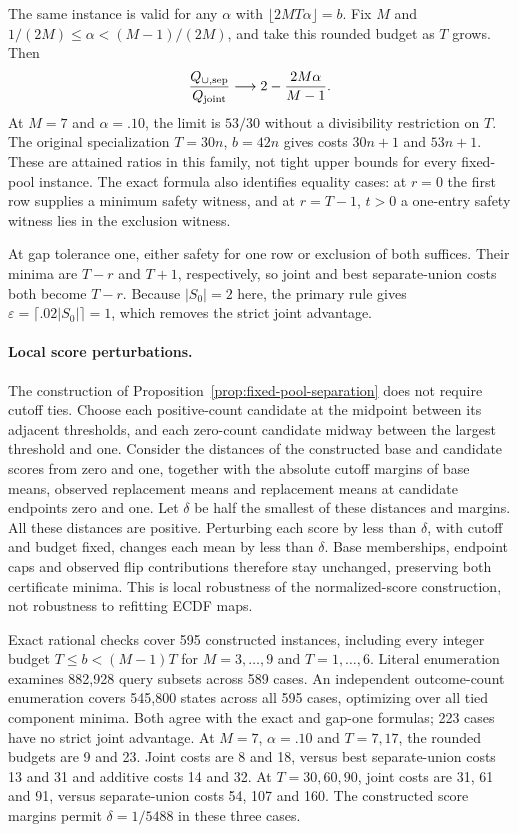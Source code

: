 The same instance is valid for any $\alpha$ with $\lfloor2MT\alpha\rfloor=b$. Fix $M$ and $1/(2M)\le\alpha<(M-1)/(2M)$, and take this rounded budget as $T$ grows. Then
\[
 \frac{Q_{\cup,\rm sep}}{Q_{\rm joint}}
 \longrightarrow 2-\frac{2M\alpha}{M-1}.
\]
At $M=7$ and $\alpha=.10$, the limit is $53/30$ without a divisibility restriction on $T$. The original specialization $T=30n$, $b=42n$ gives costs $30n+1$ and $53n+1$. These are attained ratios in this family, not tight upper bounds for every fixed-pool instance. The exact formula also identifies equality cases: at $r=0$ the first row supplies a minimum safety witness, and at $r=T-1$, $t>0$ a one-entry safety witness lies in the exclusion witness.

At gap tolerance one, either safety for one row or exclusion of both suffices. Their minima are $T-r$ and $T+1$, respectively, so joint and best separate-union costs both become $T-r$. Because $|S_0|=2$ here, the primary rule gives $\varepsilon=\lceil.02|S_0|\rceil=1$, which removes the strict joint advantage.

\paragraph{Local score perturbations.}
The construction of Proposition~\ref{prop:fixed-pool-separation} does not require cutoff ties. Choose each positive-count candidate at the midpoint between its adjacent thresholds, and each zero-count candidate midway between the largest threshold and one. Consider the distances of the constructed base and candidate scores from zero and one, together with the absolute cutoff margins of base means, observed replacement means and replacement means at candidate endpoints zero and one. Let $\delta$ be half the smallest of these distances and margins. All these distances are positive. Perturbing each score by less than $\delta$, with cutoff and budget fixed, changes each mean by less than $\delta$. Base memberships, endpoint caps and observed flip contributions therefore stay unchanged, preserving both certificate minima. This is local robustness of the normalized-score construction, not robustness to refitting ECDF maps.

Exact rational checks cover 595 constructed instances, including every integer budget $T\le b<(M-1)T$ for $M=3,\ldots,9$ and $T=1,\ldots,6$. Literal enumeration examines 882,928 query subsets across 589 cases. An independent outcome-count enumeration covers 545,800 states across all 595 cases, optimizing over all tied component minima. Both agree with the exact and gap-one formulas; 223 cases have no strict joint advantage. At $M=7$, $\alpha=.10$ and $T=7,17$, the rounded budgets are 9 and 23. Joint costs are 8 and 18, versus best separate-union costs 13 and 31 and additive costs 14 and 32. At $T=30,60,90$, joint costs are 31, 61 and 91, versus separate-union costs 54, 107 and 160. The constructed score margins permit $\delta=1/5488$ in these three cases.

